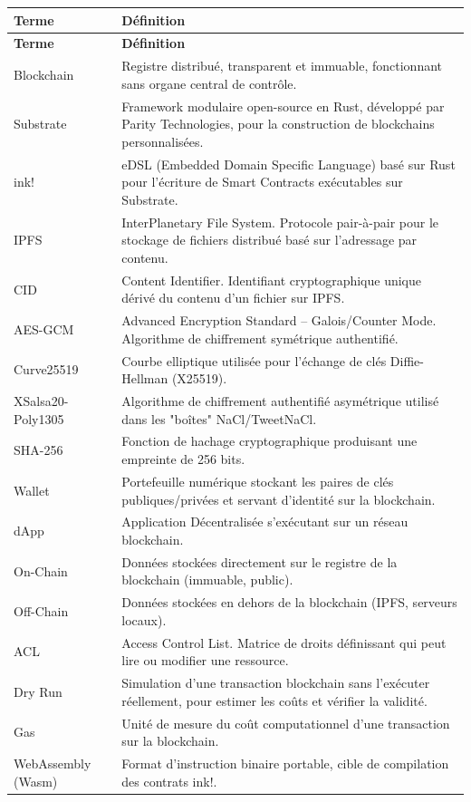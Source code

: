 \documentclass[12pt,a4paper]{report}
\begin{document}
\begin{longtable}{|p{4cm}|p{10cm}|}
\hline
\textbf{Terme} & \textbf{Définition} \\
\hline
\endfirsthead
\hline
\textbf{Terme} & \textbf{Définition} \\
\hline
\endhead
Blockchain & Registre distribué, transparent et immuable, fonctionnant sans organe central de contrôle. \\
\hline
Substrate & Framework modulaire open-source en Rust, développé par Parity Technologies, pour la construction de blockchains personnalisées. \\
\hline
ink! & eDSL (Embedded Domain Specific Language) basé sur Rust pour l'écriture de Smart Contracts exécutables sur Substrate. \\
\hline
IPFS & InterPlanetary File System. Protocole pair-à-pair pour le stockage de fichiers distribué basé sur l'adressage par contenu. \\
\hline
CID & Content Identifier. Identifiant cryptographique unique dérivé du contenu d'un fichier sur IPFS. \\
\hline
AES-GCM & Advanced Encryption Standard -- Galois/Counter Mode. Algorithme de chiffrement symétrique authentifié. \\
\hline
Curve25519 & Courbe elliptique utilisée pour l'échange de clés Diffie-Hellman (X25519). \\
\hline
XSalsa20-Poly1305 & Algorithme de chiffrement authentifié asymétrique utilisé dans les "boîtes" NaCl/TweetNaCl. \\
\hline
SHA-256 & Fonction de hachage cryptographique produisant une empreinte de 256 bits. \\
\hline
Wallet & Portefeuille numérique stockant les paires de clés publiques/privées et servant d'identité sur la blockchain. \\
\hline
dApp & Application Décentralisée s'exécutant sur un réseau blockchain. \\
\hline
On-Chain & Données stockées directement sur le registre de la blockchain (immuable, public). \\
\hline
Off-Chain & Données stockées en dehors de la blockchain (IPFS, serveurs locaux). \\
\hline
ACL & Access Control List. Matrice de droits définissant qui peut lire ou modifier une ressource. \\
\hline
Dry Run & Simulation d'une transaction blockchain sans l'exécuter réellement, pour estimer les coûts et vérifier la validité. \\
\hline
Gas & Unité de mesure du coût computationnel d'une transaction sur la blockchain. \\
\hline
WebAssembly (Wasm) & Format d'instruction binaire portable, cible de compilation des contrats ink!. \\
\hline
\end{longtable}
\end{document}
